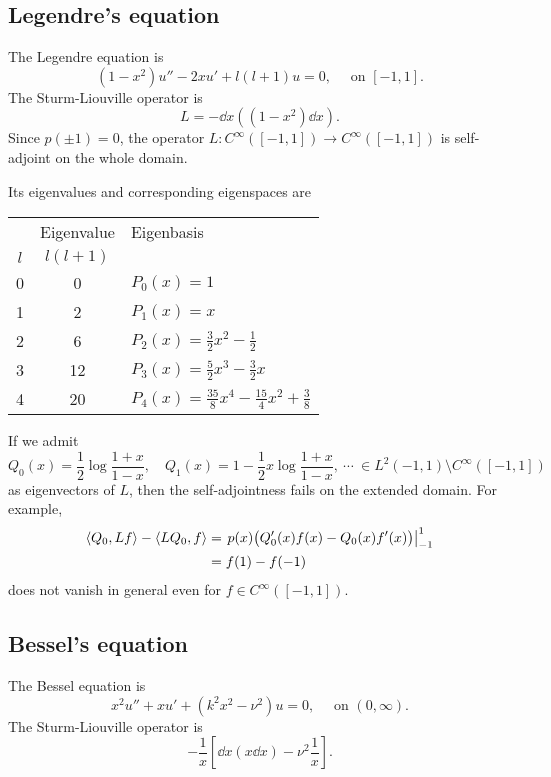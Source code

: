 \documentclass[12pt]{article}
\begin{document}
\subsection{Legendre's equation}
The Legendre equation is
\[(1-x^2)u''-2xu'+l(l+1)u=0,\quad\text{ on }[-1,1].\]
The Sturm-Liouville operator is
\[L=-\dd{x}\left((1-x^2)\dd{x}\right).\]
Since $p(\pm1)=0$, the operator $L:C^\infty([-1,1])\to C^\infty([-1,1])$ is self-adjoint on the whole domain.


Its eigenvalues and corresponding eigenspaces are
\begin{center}\renewcommand{\arraystretch}{1.2}
\begin{tabular}{c|c|l}
\hline
    & Eigenvalue & Eigenbasis \\
$l$ & $l(l+1)$   & \\
\hline
0   & 0          & $P_0(x)=1$ \\
1   & 2          & $P_1(x)=x$ \\
2   & 6          & $P_2(x)=\frac32x^2-\frac12$ \\
3   & 12         & $P_3(x)=\frac52x^3-\frac32x$ \\
4   & 20         & $P_4(x)=\frac{35}8x^4-\frac{15}4x^2+\frac38$\\
\hline
\end{tabular}
\end{center}
If we admit
\[Q_0(x)=\frac12\log\frac{1+x}{1-x},\quad Q_1(x)=1-\frac12x\log\frac{1+x}{1-x},\ \cdots\ \in L^2(-1,1)\setminus C^\infty([-1,1])\]
as eigenvectors of $L$, then the self-adjointness fails on the extended domain.
For example,
\begin{align*}
\langle Q_0,Lf\rangle-\langle LQ_0,f\rangle
&=\left.p(x)\bigl(Q_0'(x)f(x)-Q_0(x)f'(x)\bigr)\right|_{-1}^1\\
&=f(1)-f(-1)
\end{align*}
does not vanish in general even for $f\in C^\infty([-1,1])$.

\subsection{Bessel's equation}
The Bessel equation is
\[x^2u''+xu'+(k^2x^2-\nu^2)u=0,\quad\text{ on }(0,\infty).\]
The Sturm-Liouville operator is
\[-\frac1x\left[\dd{x}\left(x\dd{x}\right)-\nu^2\frac1x\right].\]
\end{document}
